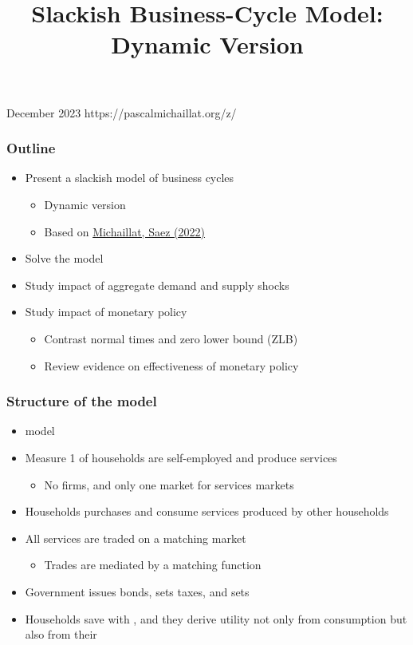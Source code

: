 \documentclass[11pt,aspectratio=169,xcolor={dvipsnames},hyperref={pdftex,pdfpagemode=UseNone,hidelinks,pdfdisplaydoctitle=true},usepdftitle=false]{beamer}
\begin{document}
\title{Slackish Business-Cycle Model: Dynamic Version}
%
{December 2023}%
{https://pascalmichaillat.org/z/}
\frame{\titlepage}

\begin{frame}
\frametitle{Outline}
\begin{itemize}
\item Present a slackish model of business cycles
\begin{itemize}
\item Dynamic version
\item Based on \href{https://pascalmichaillat.org/7/}{Michaillat, Saez (2022)}
\end{itemize}	
\item Solve the model
\item Study impact of aggregate demand and supply shocks
\item Study impact of monetary policy
\begin{itemize}
\item Contrast normal times and zero lower bound (ZLB)
\item Review evidence on effectiveness of monetary policy
\end{itemize}
\end{itemize}	
\end{frame}

\begin{frame}
\frametitle{Structure of the model}
\begin{itemize}
\item {} model
\item Measure 1 of  households are self-employed and produce services
\begin{itemize}
	\item No firms, and only one market for services markets
\end{itemize}
\item Households purchases and consume services produced by other households
\item All services are traded on a matching market 
\begin{itemize}
	\item Trades are mediated by a  matching function
\end{itemize}
\item Government issues bonds, sets taxes, and sets 
\item Households save with , and they derive utility not only from consumption but also from their 
\end{itemize}	
\end{frame}
\end{document}
